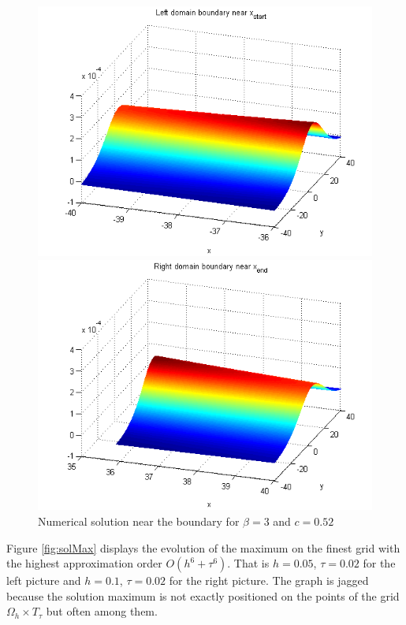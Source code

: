 \documentclass[11pt,a4paper,twoside]{article}
\begin{document}
\begin{figure}[!htbp]
\begin{minipage}[b]{0.45\linewidth}
		\includegraphics[width=\linewidth]{Pictures/LeftBoundary.png}
	\end{minipage}	
	\begin{minipage}[b]{0.45\linewidth}
		
		 \includegraphics[width=\linewidth]{Pictures/RightBoundary.png}
	\end{minipage}
	\caption{Numerical solution near the boundary for $\beta=3$ and $c = 0.52$}
	\label{fig:boundary}
\end{figure}
\fi
Figure \ref{fig:solMax} displays the evolution of the maximum on the finest grid with the highest approximation order $O(h^6 + \tau^6)$. That is $h=0.05$, $\tau = 0.02$ for the left picture and  $h=0.1$, $\tau = 0.02$ for the right picture. The graph is jagged because the solution maximum is not exactly positioned on the points of the grid $\Omega_h \times T_{\tau}$ but often among them. 
\end{document}
